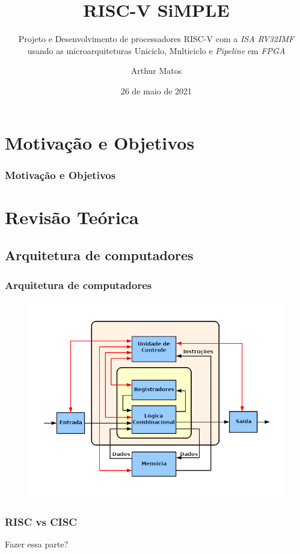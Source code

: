 \documentclass{beamer}
\title{RISC-V SiMPLE}
\subtitle{Projeto e Desenvolvimento de processadores RISC-V com a \textit{ISA RV32IMF} usando as microarquiteturas Uniciclo, Multiciclo e \textit{Pipeline} em \textit{FPGA}}
\author{Arthur Matos}
\institute{Universidade de Brasília - UnB}
\date{26 de maio de 2021}
\begin{document}
\begin{frame}
\titlepage
\end{frame}

\section{Motivação e Objetivos}
    \begin{frame}
        \frametitle{Motivação e Objetivos}
        {}
    \end{frame}

\section{Revisão Teórica}
    \subsection{Arquitetura de computadores}
    \begin{frame}
        \frametitle{Arquitetura de computadores}
        \begin{figure}[H]
        \centering
            \includegraphics[width=.9\textwidth,height=.9\textheight,keepaspectratio]{../images/ABasicComputer.png}
        \end{figure}
    \end{frame}

    \begin{frame}
        \frametitle{RISC vs CISC}
        {Fazer essa parte?} %
    \end{frame}
\end{document}
